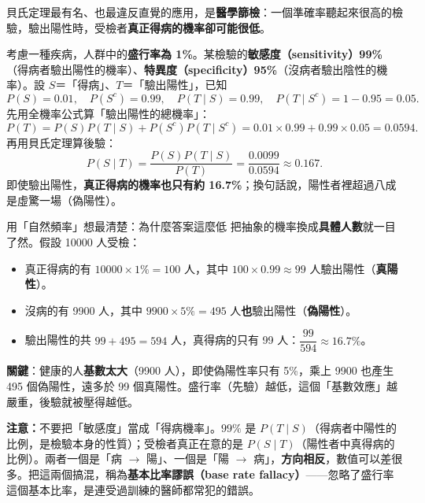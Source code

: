 \documentclass[11pt]{article}
\begin{document}
貝氏定理最有名、也最違反直覺的應用，是\textbf{醫學篩檢}：一個準確率聽起來很高的檢驗，驗出陽性時，受檢者\textbf{真正得病的機率卻可能很低}。

考慮一種疾病，人群中的\textbf{盛行率為 1\%}。某檢驗的\textbf{敏感度（sensitivity）99\%}（得病者驗出陽性的機率）、\textbf{特異度（specificity）95\%}（沒病者驗出陰性的機率）。設 $S$＝「得病」、$T$＝「驗出陽性」，已知
$$P(S)=0.01,\quad P(S^c)=0.99,\quad P(T\mid S)=0.99,\quad P(T\mid S^c)=1-0.95=0.05.$$
先用全機率公式算「驗出陽性的總機率」：
$$P(T)=P(S)P(T\mid S)+P(S^c)P(T\mid S^c)=0.01\times0.99+0.99\times0.05=0.0594.$$
再用貝氏定理算後驗：
$$P(S\mid T)=\frac{P(S)P(T\mid S)}{P(T)}=\frac{0.0099}{0.0594}\approx0.167.$$
即使驗出陽性，\textbf{真正得病的機率也只有約 16.7\%}；換句話說，陽性者裡超過八成是虛驚一場（偽陽性）。

\begin{補充框}{用「自然頻率」想最清楚：為什麼答案這麼低}
把抽象的機率換成\textbf{具體人數}就一目了然。假設 10000 人受檢：
\begin{itemize}\setlength{\itemsep}{1pt}
\item 真正得病的有 $10000\times1\%=100$ 人，其中 $100\times0.99\approx99$ 人驗出陽性（\textbf{真陽性}）。
\item 沒病的有 9900 人，其中 $9900\times5\%=495$ 人\textbf{也}驗出陽性（\textbf{偽陽性}）。
\item 驗出陽性的共 $99+495=594$ 人，真得病的只有 99 人：$\dfrac{99}{594}\approx16.7\%$。
\end{itemize}
\textbf{關鍵}：健康的人\textbf{基數太大}（9900 人），即使偽陽性率只有 5\%，乘上 9900 也產生 495 個偽陽性，遠多於 99 個真陽性。盛行率（先驗）越低，這個「基數效應」越嚴重，後驗就被壓得越低。
\end{補充框}


\textbf{注意：}不要把「敏感度」當成「得病機率」。$99\%$ 是 $P(T\mid S)$（得病者中陽性的比例，是檢驗本身的性質）；受檢者真正在意的是 $P(S\mid T)$（陽性者中真得病的比例）。兩者一個是「病 $\rightarrow$ 陽」、一個是「陽 $\rightarrow$ 病」，\textbf{方向相反}，數值可以差很多。把這兩個搞混，稱為\textbf{基本比率謬誤（base rate fallacy）}——忽略了盛行率這個基本比率，是連受過訓練的醫師都常犯的錯誤。
\end{document}
